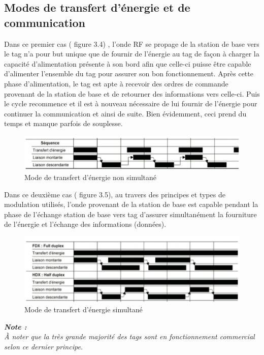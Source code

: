 \documentclass[11pt, a4paper, twoside]{book}
\begin{document}
\subsection{Modes de transfert d’énergie et de communication}
Dans ce premier cas ( figure 3.4) , l’onde RF se propage de la station de base vers le tag n’a pour but unique que de fournir de l’énergie au tag de façon à charger la  capacité d’alimentation  présente à son bord afin que celle-ci puisse être capable d’alimenter l’ensemble du tag pour assurer son bon fonctionnement. Après cette phase d'alimentation, le tag est apte à recevoir des ordres de commande provenant de la station de base et de retourner des informations vers celle-ci. Puis le cycle recommence et il est à nouveau nécessaire de lui fournir de l'énergie pour continuer la communication et ainsi de suite. Bien évidemment, ceci prend du temps et manque parfois de souplesse.\\
\begin{figure}[H]
\centering
\includegraphics[width=\textwidth]{figa}
\caption{Mode de transfert d'énergie non simultané}
\end{figure}

Dans ce deuxième cas ( figure 3.5), au travers des principes et types de modulation utilisés, l'onde provenant de la station de base est capable pendant la phase de l'échange station de base vers tag d'assurer simultanément la fourniture de l'énergie et l'échange des informations (données).\\

\begin{figure}[H]
\centering
\includegraphics[width=\textwidth]{figb}
\caption{Mode de transfert d'énergie simultané}
\end{figure}

\begin{center}
\textbf{\emph{Note :}}\\
\emph{À noter que la très grande majorité des tags sont en fonctionnement commercial selon ce dernier principe.}
\end{center}
\end{document}
